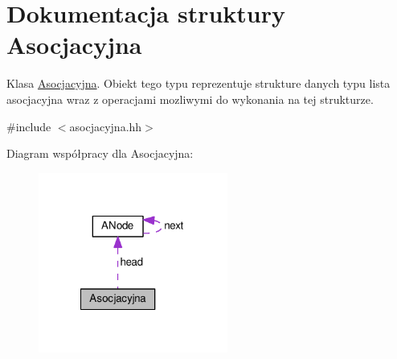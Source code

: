 \hypertarget{struct_asocjacyjna}{\section{Dokumentacja struktury Asocjacyjna}
\label{struct_asocjacyjna}
}


Klasa \hyperlink{struct_asocjacyjna}{Asocjacyjna}. Obiekt tego typu reprezentuje strukture danych typu lista asocjacyjna wraz z operacjami mozliwymi do wykonania na tej strukturze.  




{\ttfamily \#include $<$asocjacyjna.\-hh$>$}



Diagram współpracy dla Asocjacyjna\-:
\nopagebreak
\begin{figure}[H]
\begin{center}
\leavevmode
\includegraphics[width=176pt]{struct_asocjacyjna__coll__graph}
\end{center}
\end{figure}
